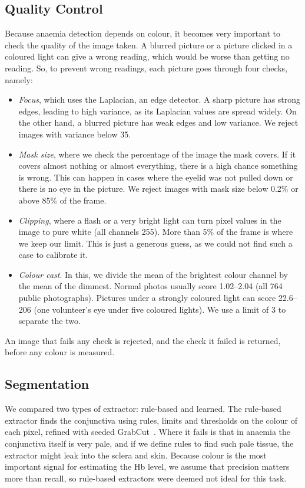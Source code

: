 \documentclass[conference]{IEEEtran}
\begin{document}
\subsection{Quality Control}
Because anaemia detection depends on colour, it becomes very important to
check the quality of the image taken. A blurred picture or a picture clicked in
a coloured light can give a wrong reading, which would be worse than getting no
reading. So, to prevent wrong readings, each picture goes through four checks,
namely:
\begin{itemize}
\item \emph{Focus}, which uses the Laplacian, an edge detector. A sharp picture
has strong edges, leading to high variance, as its Laplacian values are spread
widely. On the other hand, a blurred picture has weak edges and low variance.
We reject images with variance below 35.
\item \emph{Mask size}, where we check the percentage of the image the mask
covers. If it covers almost nothing or almost everything, there is a high
chance something is wrong. This can happen in cases where the eyelid was not
pulled down or there is no eye in the picture. We reject images with mask size
below 0.2\% or above 85\% of the frame.
\item \emph{Clipping}, where a flash or a very bright light can turn pixel
values in the image to pure white (all channels 255). More than 5\% of the frame
is where we keep our limit. This is just a generous guess, as we could not find
such a case to calibrate it.
\item \emph{Colour cast}. In this, we divide the mean of the brightest colour
channel by the mean of the dimmest. Normal photos usually score 1.02--2.04 (all 764 public photographs).
Pictures under a strongly coloured light can score 22.6--206 (one volunteer's
eye under five coloured lights). We use a limit of 3 to separate the two.
\end{itemize}
An image that fails any check is rejected, and the check it failed is returned,
before any colour is measured.

\subsection{Segmentation}
We compared two types of extractor: rule-based and learned. The rule-based
extractor finds the conjunctiva using rules, limits and thresholds on the
colour of each pixel, refined with seeded GrabCut~\cite{rother2004grabcut}.
Where it fails is that in anaemia the conjunctiva itself is
very pale, and if we define rules to find such pale tissue, the extractor might
leak into the sclera and skin. Because colour is the most important signal for
estimating the Hb level, we assume that precision matters more than recall, so
rule-based extractors were deemed not ideal for this task.
\end{document}
